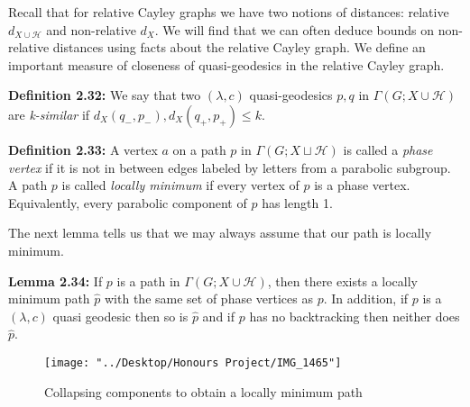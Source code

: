 \documentclass[12pt]{article}
\newcommand{\vs}{\vskip10pt}
\begin{document}
	\vs 
	
	Recall that for relative Cayley graphs we have two notions of distances: relative $d_{X \cup \mathcal{H}}$ and non-relative $d_X$. We will find that we can often deduce bounds on non-relative distances using facts about the relative Cayley graph. We define an important measure of closeness of quasi-geodesics in the relative Cayley graph. 
	
	\vs
	
	\textbf{Definition 2.32: } We say that two $(\lambda, c)$ quasi-geodesics $p, q$ in $\Gamma(G; X \cup \mathcal{H})$ are \textit{k-similar} if $d_X(q_{-}, p_{-}), d_X(q_{+}, p_{+}) \leq k$. 
	
	\vs 
	
	\textbf{Definition 2.33: } A vertex $a$ on a path $p$  in $\Gamma(G; X \sqcup \mathcal{H})$ is called a \textit{phase vertex} if it is not in between edges labeled by letters from a parabolic subgroup. A path $p$ is called \textit{locally minimum} if every vertex of $p$ is a phase vertex. Equivalently, every parabolic component of $p$ has length 1. 
	
	\vs 
	
	The next lemma tells us that we may always assume that our path is locally minimum. 
	
	\vs 
	
	\textbf{Lemma 2.34: } If $p$ is a path in $\Gamma(G;X \cup \mathcal{H})$, then there exists a locally minimum path $\hat{p}$ with the same set of phase vertices as $p$. In addition, if $p$ is a $(\lambda, c)$ quasi geodesic then so is $\hat{p}$ and if $p$ has no backtracking then neither does $\hat{p}$.
	
\begin{figure} [H]
	\centering
	\texttt{[image: "../Desktop/Honours Project/IMG\_1465"]}
	\caption{Collapsing components to obtain a locally minimum path}
	\label{fig:img1465}
\end{figure}
	
\end{document}
